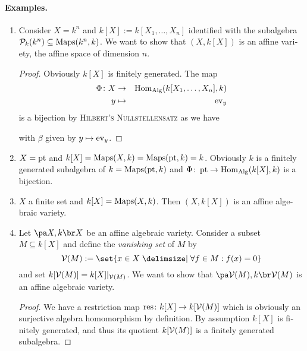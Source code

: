 \documentclass[12pt,a4paper]{scrartcl}
\theoremstyle{cplain}
\theoremstyle{cplain}
\theoremstyle{cplain}
\theoremstyle{definition}
\begin{document}
\begin{otherlanguage}{english}
\paragraph{Examples.}
\begin{enumerate}
  \item Consider $X = k^n$ and $k[X] := k[X_1,\ldots,X_n]$ identified with the subalgebra $\mathcal{P}_k(k^n) \subseteq \operatorname{Maps}(k^n,k)$. We want to show that $(X,k[X])$ is an affine variety, the affine space of dimension $n$.
  \begin{proof}
    Obviously $k[X]$ is finitely generated. The map
    \begin{eqnarray*}
      \Phi\colon X &\to& \operatorname{Hom}_{\operatorname{Alg}}(k[X_1,\ldots,X_n],k) \\
      y &\mapsto& \operatorname{ev}_y
    \end{eqnarray*}
    is a bijection by \textsc{Hilbert's Nullstellensatz} as we have
    \begin{center}
    \end{center}
    with $\beta$ given by $y \mapsto \operatorname{ev}_y$.
  \end{proof}
  \item $X = \operatorname{pt}$ and $k[X] = \operatorname{Maps}(X,k) = \operatorname{Maps}(\operatorname{pt},k) = k$. Obviously $k$ is a finitely generated subalgebra of $k = \operatorname{Maps}(\operatorname{pt},k)$ and $\Phi\colon\operatorname{pt} \to \operatorname{Hom}_{\operatorname{Alg}}(k[X],k)$ is a bijection.
  \item $X$ a finite set and $k[X] = \operatorname{Maps}(X,k)$. Then $(X,k[X])$ is an affine algebraic variety.
  \item Let $\aav X$ be an affine algebraic variety. Consider a subset $M\subseteq k[X]$ and define the \emph{vanishing set} of $M$ by \[ \Vs(M) := \set{x\in X \given \forall f\in M : f(x) = 0} \] and set $k[\mathcal{V}(M)] = k[X]|_{\mathcal{V}(M)}$. We want to show that $\aav {\Vs(M)}$ is an affine algebraic variety.
  \begin{proof}
    We have a restriction map $\operatorname{res}\colon k[X]\to k[\mathcal{V}(M)]$ which is obviously an surjective algebra homomorphism by definition. By assumption $k[X]$ is finitely generated, and thus its quotient $k[\mathcal{V}(M)]$ is a finitely generated subalgebra.


\end{proof}
\end{enumerate}
\end{otherlanguage}
\end{document}
